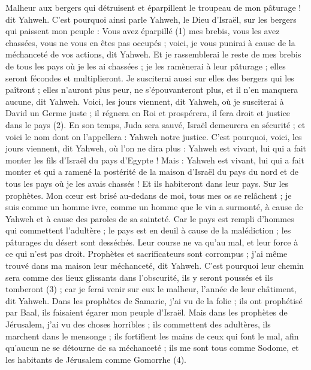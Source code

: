 \begin{multicols}{2}
\VerseOne{}Malheur aux bergers qui détruisent et éparpillent le troupeau de mon pâturage ! dit Yahweh.
C'est pourquoi ainsi parle Yahweh, le Dieu d'Israël, sur les bergers qui paissent mon peuple : Vous avez éparpillé\FTNT{} (1) mes brebis, vous les avez chassées, vous ne vous en êtes pas occupés ; voici, je vous punirai à cause de la méchanceté de vos actions, dit Yahweh.
Et je rassemblerai le reste de mes brebis de tous les pays où je les ai chassées ; je les ramènerai à leur pâturage ; elles seront fécondes et multiplieront.
Je susciterai aussi sur elles des bergers qui les paîtront ; elles n'auront plus peur, ne s'épouvanteront plus, et il n'en manquera aucune, dit Yahweh.
Voici, les jours viennent, dit Yahweh, où je susciterai à David un Germe juste ; il régnera en Roi et prospérera, il fera droit et justice dans le pays\FTNT{} (2).
En son temps, Juda sera sauvé, Israël demeurera en sécurité ; et voici le nom dont on l'appellera : Yahweh notre justice.
C'est pourquoi, voici, les jours viennent, dit Yahweh, où l’on ne dira plus : Yahweh est vivant, lui qui a fait monter les fils d'Israël du pays d'Egypte !
Mais : Yahweh est vivant, lui qui a fait monter et qui a ramené la postérité de la maison d'Israël du pays du nord et de tous les pays où je les avais chassés ! Et ils habiteront dans leur pays.
Sur les prophètes. Mon cœur est brisé au-dedans de moi, tous mes os se relâchent ; je suis comme un homme ivre, comme un homme que le vin a surmonté, à cause de Yahweh et à cause des paroles de sa sainteté.
Car le pays est rempli d'hommes qui commettent l’adultère ; le pays est en deuil à cause de la malédiction ; les pâturages du désert sont desséchés. Leur course ne va qu’au mal, et leur force à ce qui n’est pas droit.
Prophètes et sacrificateurs sont corrompus ; j'ai même trouvé dans ma maison leur méchanceté, dit Yahweh.
C'est pourquoi leur chemin sera comme des lieux glissants dans l’obscurité, ils y seront poussés et ils tomberont\FTNT{} (3) ; car je ferai venir sur eux le malheur, l'année de leur châtiment, dit Yahweh.
Dans les prophètes de Samarie, j’ai vu de la folie ; ils ont prophétisé par Baal, ils faisaient égarer mon peuple d’Israël.
Mais dans les prophètes de Jérusalem, j’ai vu des choses horribles ; ils commettent des adultères, ils marchent dans le mensonge ; ils fortifient les mains de ceux qui font le mal, afin qu’aucun ne se détourne de sa méchanceté ; ils me sont tous comme Sodome, et les habitants de Jérusalem comme Gomorrhe\FTNT{} (4).

\end{multicols}
